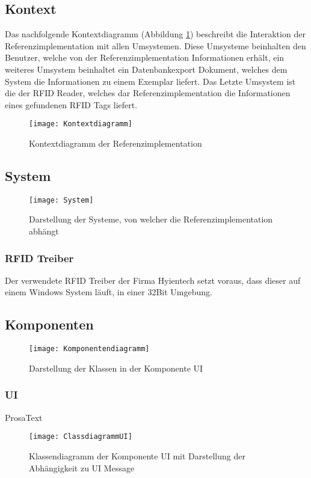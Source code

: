 \subsection{Kontext}

Das nachfolgende Kontextdiagramm (Abbildung \ref{fig:Kontextdiagramm}) beschreibt die Interaktion der Referenzimplementation mit allen Umsystemen. Diese Umsysteme beinhalten den Benutzer, welche von der Referenzimplementation Informationen erhält, ein weiteres Umsystem beinhaltet ein Datenbankexport Dokument, welches dem System die Informationen zu einem Exemplar liefert. Das Letzte Umsystem ist die der RFID Reader, welches dar Referenzimplementation die Informationen eines gefundenen RFID Tags liefert.
\begin{figure}[htb]
	\centering
	\texttt{[image: Kontextdiagramm]}
	\caption{Kontextdiagramm der Referenzimplementation}
	\label{fig:Kontextdiagramm}
\end{figure}

\subsection{System}
\begin{figure}[htb]
	\centering
	\texttt{[image: System]}
	\caption{Darstellung der Systeme, von welcher die Referenzimplementation abhängt}
	\label{fig:System}
\end{figure}
\subsubsection{RFID Treiber}
Der verwendete RFID Treiber der Firma Hyientech setzt voraus, dass dieser auf einem Windows System läuft, in einer 32Bit Umgebung.

\subsection{Komponenten}
\begin{figure}[htb]
	\centering
	\texttt{[image: Komponentendiagramm]}
	\caption{Darstellung der Klassen in der Komponente UI}
	\label{fig:Components}
\end{figure}

\subsubsection{UI}
ProsaText
\begin{figure}[htb]
	\centering
	\texttt{[image: ClassdiagrammUI]}
	\caption{Klassendiagramm der Komponente UI mit Darstellung der Abhängigkeit zu UI Message}
	\label{fig:ClassUI}
\end{figure}
